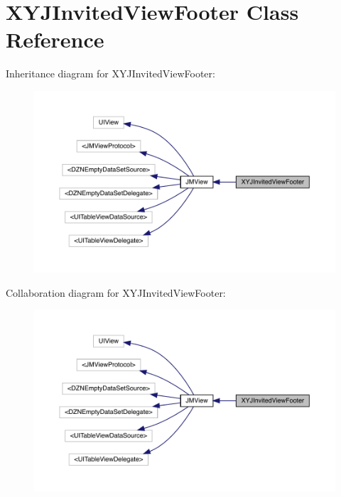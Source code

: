 \hypertarget{interface_x_y_j_invited_view_footer}{}\section{X\+Y\+J\+Invited\+View\+Footer Class Reference}
\label{interface_x_y_j_invited_view_footer}


Inheritance diagram for X\+Y\+J\+Invited\+View\+Footer\+:\nopagebreak
\begin{figure}[H]
\begin{center}
\leavevmode
\includegraphics[width=350pt]{interface_x_y_j_invited_view_footer__inherit__graph}
\end{center}
\end{figure}


Collaboration diagram for X\+Y\+J\+Invited\+View\+Footer\+:\nopagebreak
\begin{figure}[H]
\begin{center}
\leavevmode
\includegraphics[width=350pt]{interface_x_y_j_invited_view_footer__coll__graph}
\end{center}
\end{figure}
